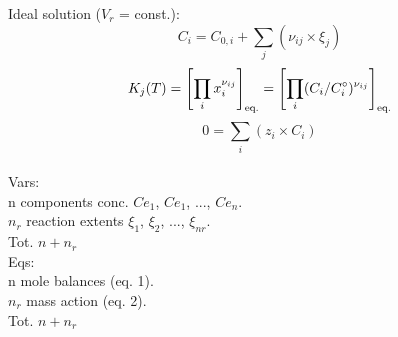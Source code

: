 \documentclass{article}
\begin{document}
Ideal solution ($V_r$ = const.):
\begin{equation}
C_i = C_{0,i} + \sum_j(\nu_{ij} \times \xi_j)
\end{equation}
\begin{equation}
K_j(T) = \left[ \prod_ix_i^{\nu_{ij}} \right]_{\textnormal{eq.}}= 
\left[ \prod_i(C_i/C^{\circ}_i)^{\nu_{ij}} \right]_{\textnormal{eq.}}
\end{equation}
\begin{equation}
0 = \sum_i(z_i \times C_i)
\end{equation}
\\
Vars: \\
n components conc. $Ce_1$, $Ce_1$, ..., $Ce_n$. \\
$n_r$ reaction extents $\xi_1$, $\xi_2$, ..., $\xi_{nr}$. \\
Tot. $n + n_r$ \\
Eqs: \\
n mole balances (eq. 1). \\
$n_r$ mass action (eq. 2). \\
Tot. $n + n_r$
\end{document}
